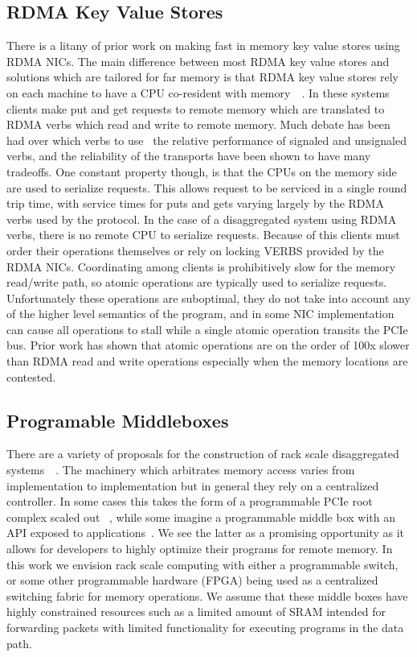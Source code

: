 \subsection{RDMA Key Value Stores}

There is a litany of prior work on making fast in memory key value stores using
RDMA NICs. The main difference between most RDMA key value stores and solutions
which are tailored for far memory is that RDMA key value stores rely on each
machine to have a CPU co-resident with memory~\cite{herd,pilaf,storm,soNUMA,
MemC3}~. In these systems clients make put and get requests to remote memory
which are translated to RDMA verbs which read and write to remote memory. Much
debate has been had over which verbs to use~\cite{storm, herd, eRPC} the
relative performance of signaled and unsignaled verbs, and the reliability of
the transports have been shown to have many tradeoffs. One constant property
though, is that the CPUs on the memory side are used to serialize requests. This
allows request to be serviced in a single round trip time, with service times
for puts and gets varying largely by the RDMA verbs used by the protocol. In the
case of a disaggregated system using RDMA verbs, there is no remote CPU to
serialize requests. Because of this clients must order their operations
themselves or rely on locking VERBS provided by the RDMA NICs. Coordinating
among clients is prohibitively slow for the memory read/write path, so atomic
operations are typically used to serialize requests. Unfortunately these
operations are suboptimal, they do not take into account any of the higher level
semantics of the program, and in some NIC implementation can cause all operations
to stall while a single atomic operation transits the PCIe bus. Prior work has
shown that atomic operations are on the order of 100x slower than RDMA read and
write operations especially when the memory locations are contested.

\subsection{Programable Middleboxes}

There are a variety of proposals for the construction of rack scale
disaggregated systems~\cite{firebox, beyond, disandapp}~. The machinery which arbitrates memory access varies from
implementation to implementation but in general they rely on a centralized
controller. In some cases this takes the form of a programmable PCIe root
complex scaled out ~, while some imagine a programmable
middle box with an API exposed to applications~\cite{disandapp}. We see the latter as a promising opportunity as it allows for
developers to highly optimize their programs for remote memory. In this work we
envision rack scale computing with either a programmable switch, or some other
programmable hardware (FPGA) being used as a centralized switching fabric for
memory operations. We assume that these middle boxes have highly constrained
resources such as a limited amount of SRAM intended for forwarding packets with
limited functionality for executing programs in the data path.

